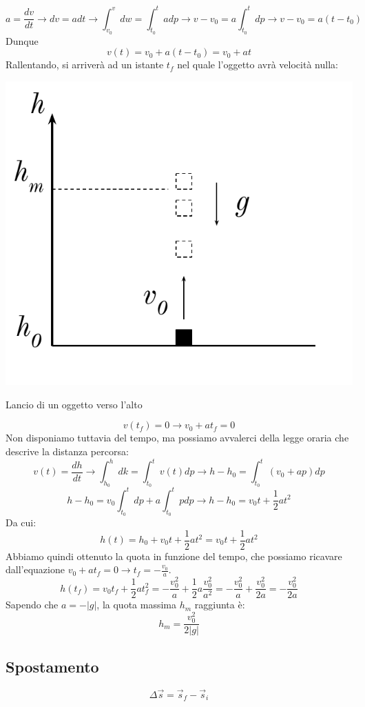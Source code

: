 \[ a = \frac{dv}{dt} \to dv = adt \to \int_{v_0}^{v}dw = \int_{t_0}^{t}adp \to v - v_0 = a\int_{t_0}^{t}dp \to v - v_0 = a(t - t_0) \]
Dunque
\[ v(t) = v_0 + a(t - t_0) = v_0 + at \]
Rallentando, si arriverà ad un istante $t_f$ nel quale l'oggetto avrà velocità
nulla:
\begin{marginfigure}
    \centering
    \includegraphics[width = \marginparwidth]{figures/greve.pdf}
    \caption{Lancio di un oggetto verso l'alto}
    \label{lanciobasso}
\end{marginfigure}
\[ v(t_f) = 0 \to v_0 + at_f = 0 \]
Non disponiamo tuttavia del tempo, ma possiamo avvalerci della legge oraria
che descrive la distanza percorsa:
\[ v(t) = \frac{dh}{dt} \to \int_{h_0}^{h}dk = \int_{t_0}^{t}v(t)dp \to h - h_0 = \int_{t_0}^{t}(v_0 + ap)dp \]
\[ h - h_0 = v_0\int_{t_0}^{t}dp + a\int_{t_0}^{t}pdp \to h - h_0 = v_0t + \frac12 at^2 \]
Da cui:
\[ h(t) = h_0 + v_0t + \frac12 at^2 = v_0t + \frac12 at^2 \]
Abbiamo quindi ottenuto la quota in funzione del tempo, che possiamo ricavare
dall'equazione $v_0 + at_f = 0 \to t_f = -\frac{v_0}{a}$.
\[ h(t_f) = v_0t_f + \frac12 at_{f}^2 =  -\frac{v_0^2}{a} + \frac{1}{2}a\frac{v_0^2}{a^2} = -\frac{v_0^2}{a} + \frac{v_0^2}{2a} = -\frac{v_0^2}{2a} \]
Sapendo che $a = -|g|$, la quota massima $h_m$ raggiunta è:
\[ h_m = \frac{v_0^2}{2|g|} \]


\subsection*{Spostamento}
\[ \Delta\overrightarrow{s} = \overrightarrow{s}_f - \overrightarrow{s}_i \]


